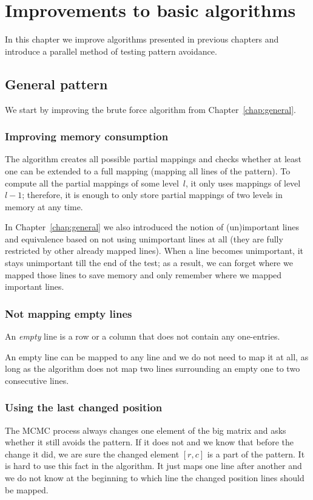 \chapter{Improvements to basic algorithms}
\label{chap:imp}
In this chapter we improve algorithms presented in previous chapters and introduce a parallel method of testing pattern avoidance.

\section{General pattern}
We start by improving the brute force algorithm from Chapter~\ref{chap:general}.

\subsection{Improving memory consumption}
The algorithm creates all possible partial mappings and checks whether at least one can be extended to a full mapping (mapping all lines of the pattern). To compute all the partial mappings of some level~$l$, it only uses mappings of level~$l-1$; therefore, it is enough to only store partial mappings of two levels in memory at any time.

In Chapter~\ref{chap:general} we also introduced the notion of (un)important lines and equivalence based on not using unimportant lines at all (they are fully restricted by other already mapped lines). When a line becomes unimportant, it stays unimportant till the end of the test; as a result, we can forget where we mapped those lines to save memory and only remember where we mapped important lines.

\subsection{Not mapping empty lines}
\begin{defn}
An \emph{empty} line is a row or a column that does not contain any one-entries.
\end{defn}
An empty line can be mapped to any line and we do not need to map it at all, as long as the algorithm does not map two lines surrounding an empty one to two consecutive lines.

\subsection{Using the last changed position}
The MCMC process always changes one element of the big matrix and asks whether it still avoids the pattern. If it does not and we know that before the change it did, we are sure the changed element $[r,c]$ is a part of the pattern. It is hard to use this fact in the algorithm. It just maps one line after another and we do not know at the beginning to which line the changed position lines should be mapped.

